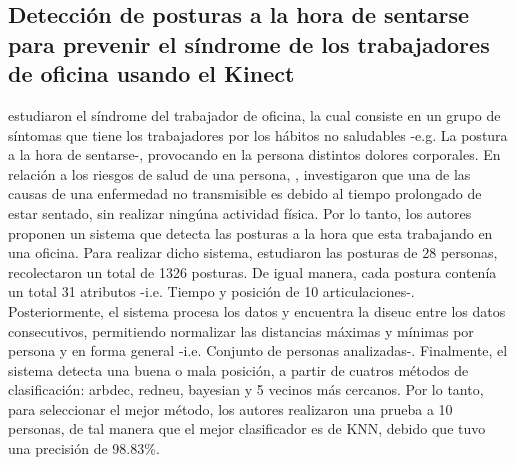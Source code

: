 \subsection{Detecci\'on de posturas a la hora de sentarse para prevenir el s\'indrome de los trabajadores de oficina usando el Kinect} \label{tr:3}
 estudiaron el s\'indrome del trabajador de oficina, la cual consiste en un grupo de s\'intomas que tiene los trabajadores por los h\'abitos no saludables -e.g. La postura a la hora de sentarse-, provocando en la persona distintos dolores corporales.
\medbreak
En relaci\'on a los riesgos de salud de una persona, , investigaron que una de las causas de una enfermedad no transmisible es debido al tiempo prolongado de estar sentado, sin realizar ning\'una actividad f\'isica. Por lo tanto, los autores  proponen un sistema que detecta las posturas a la hora que esta trabajando en una oficina.
\medbreak
Para realizar dicho sistema,  estudiaron las posturas de 28 personas,  recolectaron un total de 1326 posturas. De igual manera, cada postura conten\'ia un total 31 atributos -i.e. Tiempo y posici\'on de 10 articulaciones-. Posteriormente, el sistema procesa los datos y encuentra la \gls{diseuc} entre los datos consecutivos, permitiendo normalizar las distancias m\'aximas y m\'inimas por persona y en forma general -i.e. Conjunto de personas analizadas-.
\medbreak
Finalmente, el sistema detecta una buena o mala posici\'on, a partir de cuatros m\'etodos de clasificaci\'on: \gls{arbdec}, \gls{redneu}, \gls{bayesian} y 5 vecinos m\'as cercanos. Por lo tanto, para seleccionar el mejor m\'etodo, los autores realizaron una prueba a 10 personas, de tal manera que el mejor  clasificador es de \acrfull{KNN}, debido que tuvo una precisi\'on de  98.83\%. 
